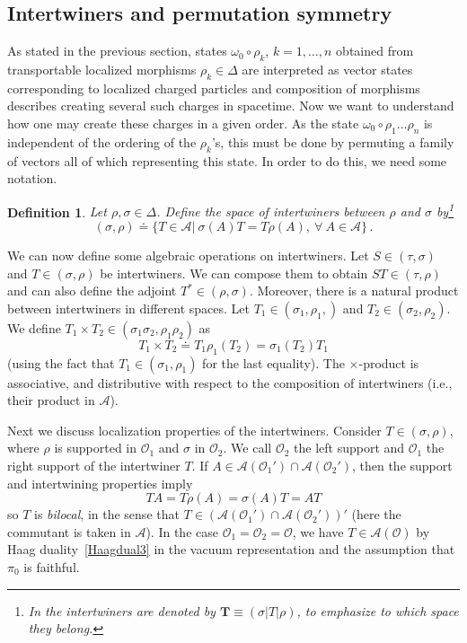 \documentclass[12pt]{article}
\newcommand{\1}{\mathds{1}}                         %
\newcommand{\Ocal}{\mathcal{O}}
\newcommand{\Ac}{{\mathcal{A}}}
\newtheorem{df}[theorem]{Definition}}
\begin{document}
\subsection{Intertwiners and permutation symmetry}\label{sec:intertwiners}
As stated in the previous section, states $\omega_0\circ \rho_k$, $k=1,\dots,n$ obtained from transportable localized morphisms $\rho_k\in \Delta$ are interpreted as vector states corresponding to localized charged particles and composition of morphisms describes creating several such charges in spacetime. Now we want to understand how one may create these charges in a given order. As the state $\omega_0\circ\rho_1\dots \rho_n$ is independent of the ordering of the $\rho_k$'s, this must be done by permuting a family of vectors all of which representing this state. In order to do this, we need some notation.

\begin{df}
	Let $\rho,\sigma\in\Delta$. Define the space of \emph{intertwiners} between $\rho$ and $\sigma$ by\footnote{In \cite{DHR3,DHR4} the intertwiners are denoted by $\mathbf{T}\equiv (\sigma|T|\rho)$, to emphasize to which space they belong.}
	\[
	(\sigma,\rho)\doteq \{T\in\Ac|\ \sigma(A) T=T\rho(A),~\forall~A\in\Ac\}\,.
	\]
\end{df}
We can now define some algebraic operations on intertwiners. Let $S\in (\tau,\sigma)$ and $T\in (\sigma,\rho)$ be intertwiners. We can compose them to obtain $ST\in(\tau,\rho)$ and can also define the adjoint $T^*\in(\rho,\sigma)$. Moreover, there is a natural product between intertwiners in different spaces. Let $T_1\in (\sigma_1,\rho_1,)$ and $T_2\in (\sigma_2,\rho_2)$. We define $ T_1\times T_2\in (\sigma_1\sigma_2,\rho_1\rho_2)$ as
\[
T_1\times T_2\doteq T_1\rho_1(T_2)=\sigma_1(T_2)T_1
\]
(using the fact that $T_1\in (\sigma_1,\rho_1)$ for the last equality).
The $\times$-product is associative, and distributive with respect to the composition of intertwiners (i.e., their product in $\Ac$).

Next we discuss localization properties of the intertwiners.
Consider $T\in(\sigma,\rho)$, where $\rho$ is supported in $\Ocal_1$ and $\sigma$ in $\Ocal_2$. We call $\Ocal_2$ the left support and $\Ocal_1$ the right support of the intertwiner $T$. 
If $A\in \Ac(\Ocal_1')\cap\Ac(\Ocal_2')$, then the support and intertwining properties imply
\[
TA = T\rho(A)= \sigma(A)T = AT
\]
so $T$ is \emph{bilocal}, in the sense that $T\in(\Ac(\Ocal_1')\cap\Ac(\Ocal_2'))'$ (here the commutant is taken in $\Ac$). In the case $\Ocal_1=\Ocal_2=\Ocal$, we have $T\in\Ac(\Ocal)$ by Haag duality~\eqref{Haagdual3} in the vacuum representation and the assumption that $\pi_0$ is faithful.
 
\end{document}
